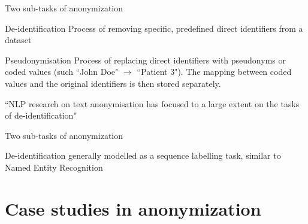 \documentclass[12pt,aspectratio=169,handout]{beamer}
\begin{document}
\begin{frame}{Two sub-tasks of anonymization}

\begin{block}{De-identification}
Process of removing specific, predefined direct identifiers from a dataset
\end{block}

\begin{block}{Pseudonymisation}
Process of replacing direct identifiers with pseudonyms or coded values (such ``John Doe" $\rightarrow$ ``Patient 3"). The mapping between coded values and the original identifiers is then stored separately.
\end{block}


``NLP research on text anonymisation has focused to a large extent on the tasks of de-identification" \citep[p.~4190]{Lison.et.al.2021.ACL}

\end{frame}



\begin{frame}{Two sub-tasks of anonymization}

De-identification generally modelled as a sequence labelling task, similar to Named Entity Recognition


\end{frame}

\section{Case studies in anonymization}
\end{document}
